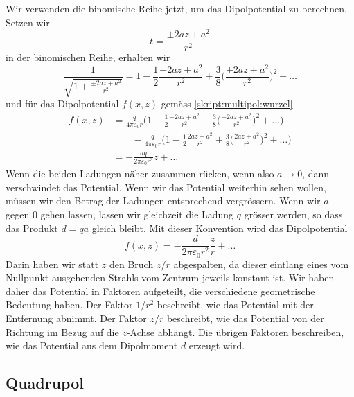 Wir verwenden die binomische Reihe jetzt, um das Dipolpotential
zu berechnen.
Setzen wir 
\[
t=\frac{\pm 2az+a^2}{r^2}
\]
in der binomischen Reihe, erhalten wir
\[
\frac{1}{\sqrt{1+\frac{\pm 2az+a^2}{r^2}}}
=
1-\frac12\frac{\pm 2az+a^2}{r^2}
+
\frac38 \biggl(\frac{\pm 2az+a^2}{r^2}\biggr)^2+\dots
\]
und für das Dipolpotential $f(x,z)$ gemäss \eqref{skript:multipol:wurzel}
\begin{align*}
f(x,z)
&=
\frac{q}{4\pi\varepsilon_0 r}
\biggl(
1-\frac12\frac{-2az+a^2}{r^2} + \frac38 \biggl(\frac{-2az+a^2}{r^2}\biggr)^2+\dots
\biggr)
\\
&\qquad
-
\frac{q}{4\pi\varepsilon_0 r}
\biggl(
1-\frac12\frac{2az+a^2}{r^2} + \frac38 \biggl(\frac{2az+a^2}{r^2}\biggr)^2+\dots
\biggr)
\\
&=
-\frac{aq}{2\pi\varepsilon_0r^3}z + \dots
\end{align*}
Wenn die beiden Ladungen näher zusammen rücken, wenn also $a\to 0$,
dann verschwindet das Potential.
Wenn wir das Potential weiterhin sehen wollen, müssen wir den Betrag
der Ladungen entsprechend vergrössern.
Wenn wir $a$ gegen $0$ gehen lassen, lassen wir gleichzeit die Ladung
$q$ grösser werden, so dass das Produkt $d=qa$ gleich bleibt.
Mit dieser Konvention wird das Dipolpotential
\[
f(x,z) = -\frac{d}{2\pi\varepsilon_0 r^2}\frac{z}{r}+\dots
\]
Darin haben wir statt $z$ den Bruch $z/r$ abgespalten, da dieser
eintlang eines vom Nullpunkt ausgehenden Strahls vom Zentrum jeweils
konstant ist.
Wir haben daher das Potential in Faktoren aufgeteilt, die verschiedene
geometrische Bedeutung haben.
Der Faktor $1/r^2$ beschreibt, wie das Potential mit der Entfernung abnimmt.
Der Faktor $z/r$ beschreibt, wie das Potential von der Richtung im
Bezug auf die $z$-Achse abhängt.
Die übrigen Faktoren beschreiben, wie das Potential aus dem Dipolmoment
$d$ erzeugt wird.

\subsection{Quadrupol}




